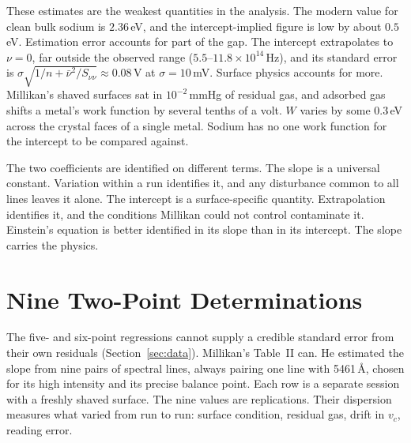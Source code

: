 \documentclass[12pt]{article}
\begin{document}
These estimates are the weakest quantities in the analysis.  The modern value
for clean bulk sodium is $2.36$\,eV, and the intercept-implied figure is low
by about $0.5$\,eV.  Estimation error accounts for part of the gap.  The
intercept extrapolates to $\nu=0$, far outside the observed range
($5.5$--$11.8\times10^{14}$\,Hz), and its standard error is
$\sigma\sqrt{1/n + \bar\nu^2/S_{\nu\nu}} \approx 0.08$\,V at
$\sigma = 10$\,mV.  Surface physics accounts for more.  Millikan's shaved
surfaces sat in $10^{-2}$\,mmHg of residual gas, and adsorbed gas shifts a
metal's work function by several tenths of a volt.  $W$ varies by some
$0.3$\,eV across the crystal faces of a single metal.  Sodium has no one work
function for the intercept to be compared against.

The two coefficients are identified on different terms.  The slope is a
universal constant.  Variation within a run identifies it, and any disturbance
common to all lines leaves it alone.  The intercept is a surface-specific
quantity.  Extrapolation identifies it, and the conditions Millikan could not
control contaminate it.  Einstein's equation is better identified in its slope
than in its intercept.  The slope carries the physics.

\section{Nine Two-Point Determinations}
\label{sec:twopoint}

The five- and six-point regressions cannot supply a credible standard error
from their own residuals (Section~\ref{sec:data}).  Millikan's Table~II can.
He estimated the slope from nine pairs of spectral lines, always pairing one
line with 5461\,\AA, chosen for its high intensity and its precise balance
point.  Each row is a separate session with a freshly shaved surface.  The
nine values are replications.  Their dispersion measures what varied from run
to run: surface condition, residual gas, drift in $v_c$, reading error.
\end{document}
